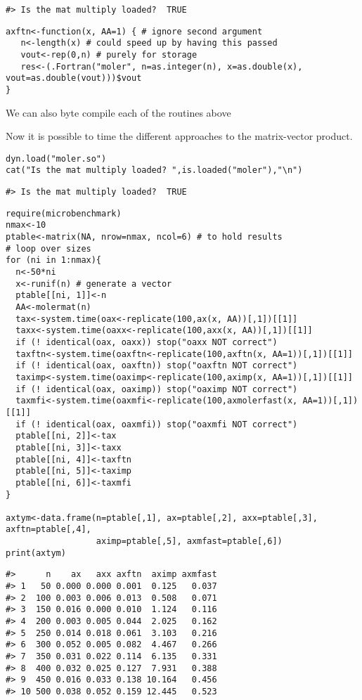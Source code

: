 \begin{verbatim}
#> Is the mat multiply loaded?  TRUE
\end{verbatim}

\begin{verbatim}
axftn<-function(x, AA=1) { # ignore second argument
   n<-length(x) # could speed up by having this passed
   vout<-rep(0,n) # purely for storage
   res<-(.Fortran("moler", n=as.integer(n), x=as.double(x), vout=as.double(vout)))$vout
}
\end{verbatim}

We can also byte compile each of the routines above

Now it is possible to time the different approaches to the matrix-vector
product.

\begin{verbatim}
dyn.load("moler.so")
cat("Is the mat multiply loaded? ",is.loaded("moler"),"\n")
\end{verbatim}

\begin{verbatim}
#> Is the mat multiply loaded?  TRUE
\end{verbatim}

\begin{verbatim}
require(microbenchmark)
nmax<-10
ptable<-matrix(NA, nrow=nmax, ncol=6) # to hold results
# loop over sizes
for (ni in 1:nmax){
  n<-50*ni
  x<-runif(n) # generate a vector 
  ptable[[ni, 1]]<-n
  AA<-molermat(n)
  tax<-system.time(oax<-replicate(100,ax(x, AA))[,1])[[1]]
  taxx<-system.time(oaxx<-replicate(100,axx(x, AA))[,1])[[1]]
  if (! identical(oax, oaxx)) stop("oaxx NOT correct")
  taxftn<-system.time(oaxftn<-replicate(100,axftn(x, AA=1))[,1])[[1]]
  if (! identical(oax, oaxftn)) stop("oaxftn NOT correct")
  taximp<-system.time(oaximp<-replicate(100,aximp(x, AA=1))[,1])[[1]]
  if (! identical(oax, oaximp)) stop("oaximp NOT correct")
  taxmfi<-system.time(oaxmfi<-replicate(100,axmolerfast(x, AA=1))[,1])[[1]]
  if (! identical(oax, oaxmfi)) stop("oaxmfi NOT correct")
  ptable[[ni, 2]]<-tax
  ptable[[ni, 3]]<-taxx
  ptable[[ni, 4]]<-taxftn
  ptable[[ni, 5]]<-taximp
  ptable[[ni, 6]]<-taxmfi
}

axtym<-data.frame(n=ptable[,1], ax=ptable[,2], axx=ptable[,3],  axftn=ptable[,4], 
                  aximp=ptable[,5], axmfast=ptable[,6])
print(axtym)
\end{verbatim}

\begin{verbatim}
#>      n    ax   axx axftn  aximp axmfast
#> 1   50 0.000 0.000 0.001  0.125   0.037
#> 2  100 0.003 0.006 0.013  0.508   0.071
#> 3  150 0.016 0.000 0.010  1.124   0.116
#> 4  200 0.003 0.005 0.044  2.025   0.162
#> 5  250 0.014 0.018 0.061  3.103   0.216
#> 6  300 0.052 0.005 0.082  4.467   0.266
#> 7  350 0.031 0.022 0.114  6.135   0.331
#> 8  400 0.032 0.025 0.127  7.931   0.388
#> 9  450 0.016 0.033 0.138 10.164   0.456
#> 10 500 0.038 0.052 0.159 12.445   0.523
\end{verbatim}

